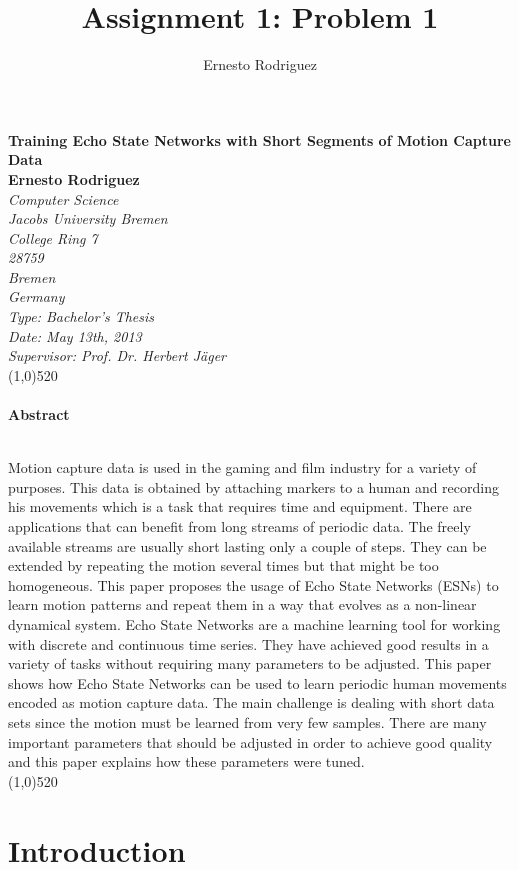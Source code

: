 \documentclass[letterpaper,9pt]{article}
\title{Assignment 1: Problem 1}
\author{Ernesto Rodriguez}
\begin{document}
\Huge{\bf Training Echo State Networks with Short Segments of Motion Capture Data\\[1cm]}
\large{\bf Ernesto Rodriguez\\[0.5cm]}
\emph{Computer Science \\ Jacobs University Bremen \\ College Ring 7 \\ 28759 \\ Bremen \\ Germany\\[0.5cm]}
\emph{Type: Bachelor's Thesis \\ Date: May 13th, 2013 \\ Supervisor: Prof. Dr. Herbert J\"{a}ger\\}
\line(1,0){520}\\ \\
\Large{\bf Abstract\\ \\}

Motion capture data is used in the gaming and film industry for a variety of purposes. This data is obtained by attaching markers to a human and recording his movements which is a task that requires time and equipment. There are applications that can benefit from long streams of periodic data. The freely available streams are usually short lasting only a couple of steps. They can be extended by repeating the motion several times but that might be too homogeneous. This paper proposes the usage of Echo State Networks (ESNs) to learn motion patterns and repeat them in a way that evolves as a non-linear dynamical system. Echo State Networks are a machine learning tool for working with discrete and continuous time series. They have achieved good results in a variety of tasks without requiring many parameters to be adjusted. This paper shows how Echo State Networks can be used to learn periodic human movements encoded as motion capture data. The main challenge is dealing with short data sets since the motion must be learned from very few samples. There are many important parameters that should be adjusted in order to achieve good quality and this paper explains how these parameters were tuned. \\

\noindent\line(1,0){520}

\pagebreak

\tableofcontents

\pagebreak

\section{Introduction}
\end{document}
